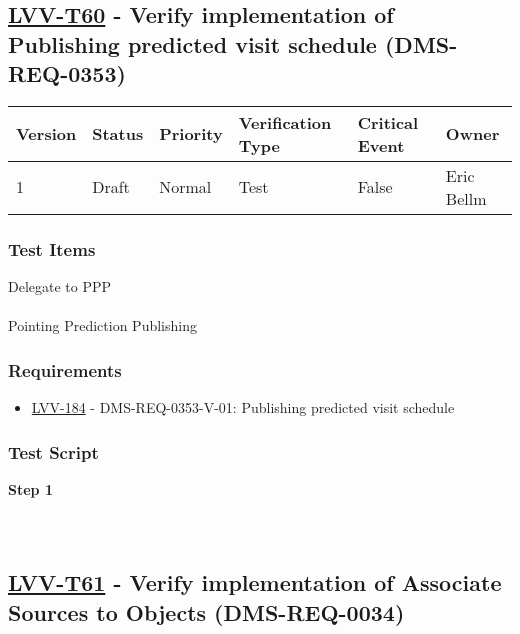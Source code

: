 \hypertarget{lvv-t60---verify-implementation-of-publishing-predicted-visit-schedule-dms-req-0353}{%
\subsection{\texorpdfstring{\href{https://jira.lsstcorp.org/secure/Tests.jspa\#/testCase/LVV-T60}{LVV-T60}
- Verify implementation of Publishing predicted visit schedule
(DMS-REQ-0353)}{LVV-T60 - Verify implementation of Publishing predicted visit schedule (DMS-REQ-0353)}}\label{lvv-t60---verify-implementation-of-publishing-predicted-visit-schedule-dms-req-0353}}

\begin{longtable}[]{@{}llllll@{}}
\toprule
Version & Status & Priority & Verification Type & Critical Event &
Owner\tabularnewline
\midrule
\endhead
1 & Draft & Normal & Test & False & Eric Bellm\tabularnewline
\bottomrule
\end{longtable}

\hypertarget{test-items-149}{%
\subsubsection{Test Items}\label{test-items-149}}

Delegate to PPP\\
~\\
Pointing Prediction Publishing

\hypertarget{requirements-150}{%
\subsubsection{Requirements}\label{requirements-150}}

\begin{itemize}
\tightlist
\item
  \href{https://jira.lsstcorp.org/browse/LVV-184}{LVV-184} -
  DMS-REQ-0353-V-01: Publishing predicted visit schedule
\end{itemize}

\hypertarget{test-script-150}{%
\subsubsection{Test Script}\label{test-script-150}}

\textbf{Step 1}\\
~\\
~\\

\hypertarget{lvv-t61---verify-implementation-of-associate-sources-to-objects-dms-req-0034}{%
\subsection{\texorpdfstring{\href{https://jira.lsstcorp.org/secure/Tests.jspa\#/testCase/LVV-T61}{LVV-T61}
- Verify implementation of Associate Sources to Objects
(DMS-REQ-0034)}{LVV-T61 - Verify implementation of Associate Sources to Objects (DMS-REQ-0034)}}\label{lvv-t61---verify-implementation-of-associate-sources-to-objects-dms-req-0034}}

